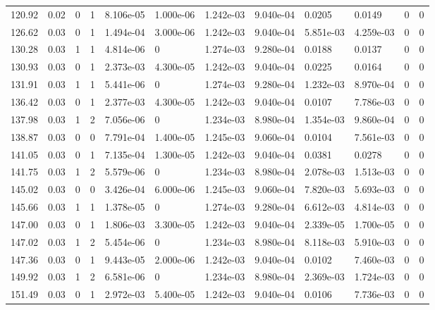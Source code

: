 \documentclass[preview]{standalone}
\begin{document}
{{{\begin{tabular}{L{1.2cm}C{1.2cm} C{0.3cm}C{0.5cm} C{1.4cm}C{1.4cm} C{1.4cm}C{1.4cm} C{1.6cm}C{1.6cm} C{1.6cm}C{1.6cm}}
  120.92  &  0.02  & 0     &  1 &  8.106e-05  & 1.000e-06  &  1.242e-03&   9.040e-04& 0.0205 & 0.0149   &  0 & 0  \\ 
  126.62  &  0.03  & 0     &  1 &  1.494e-04  & 3.000e-06  &  1.242e-03&   9.040e-04& 5.851e-03 & 4.259e-03   &  0 & 0  \\ 
  130.28  &  0.03  & 1     &  1 &  4.814e-06  & 0  &  1.274e-03&   9.280e-04& 0.0188 & 0.0137   &  0 & 0  \\ 
  130.93  &  0.03  & 0     &  1 &  2.373e-03  & 4.300e-05  &  1.242e-03&   9.040e-04& 0.0225 & 0.0164   &  0 & 0  \\ 
  131.91  &  0.03  & 1     &  1 &  5.441e-06  & 0  &  1.274e-03&   9.280e-04& 1.232e-03 & 8.970e-04   &  0 & 0  \\ 
  136.42  &  0.03  & 0     &  1 &  2.377e-03  & 4.300e-05  &  1.242e-03&   9.040e-04& 0.0107 & 7.786e-03   &  0 & 0  \\ 
  137.98  &  0.03  & 1     &  2 &  7.056e-06  & 0  &  1.234e-03&   8.980e-04& 1.354e-03 & 9.860e-04   &  0 & 0  \\ 
  138.87  &  0.03  & 0     &  0 &  7.791e-04  & 1.400e-05  &  1.245e-03&   9.060e-04& 0.0104 & 7.561e-03   &  0 & 0  \\ 
  141.05  &  0.03  & 0     &  1 &  7.135e-04  & 1.300e-05  &  1.242e-03&   9.040e-04& 0.0381 & 0.0278   &  0 & 0  \\ 
  141.75  &  0.03  & 1     &  2 &  5.579e-06  & 0  &  1.234e-03&   8.980e-04& 2.078e-03 & 1.513e-03   &  0 & 0  \\ 
  145.02  &  0.03  & 0     &  0 &  3.426e-04  & 6.000e-06  &  1.245e-03&   9.060e-04& 7.820e-03 & 5.693e-03   &  0 & 0  \\ 
  145.66  &  0.03  & 1     &  1 &  1.378e-05  & 0  &  1.274e-03&   9.280e-04& 6.612e-03 & 4.814e-03   &  0 & 0  \\ 
  147.00  &  0.03  & 0     &  1 &  1.806e-03  & 3.300e-05  &  1.242e-03&   9.040e-04& 2.339e-05 & 1.700e-05   &  0 & 0  \\ 
  147.02  &  0.03  & 1     &  2 &  5.454e-06  & 0  &  1.234e-03&   8.980e-04& 8.118e-03 & 5.910e-03   &  0 & 0  \\ 
  147.36  &  0.03  & 0     &  1 &  9.443e-05  & 2.000e-06  &  1.242e-03&   9.040e-04& 0.0102 & 7.460e-03   &  0 & 0  \\ 
  149.92  &  0.03  & 1     &  2 &  6.581e-06  & 0  &  1.234e-03&   8.980e-04& 2.369e-03 & 1.724e-03   &  0 & 0  \\ 
  151.49  &  0.03  & 0     &  1 &  2.972e-03  & 5.400e-05  &  1.242e-03&   9.040e-04& 0.0106 & 7.736e-03   &  0 & 0  \\ 

\end{tabular}}}}
\end{document}
